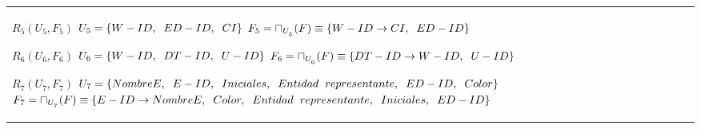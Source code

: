 \documentclass{report}
\begin{document}
\begin{tabularx}{\textwidth}{|X|}
        $ R_{5} ( U_{5} , F_{5} ) $ \newline 
        $ U_{5} = \{{W-ID, \hspace{0.2cm}  ED-ID, \hspace{0.2cm}  CI}\} $ \newline 
        $ F_{5} = \sqcap_{U_{_{5}}}(F) \equiv \{W-ID \rightarrow CI, \hspace{0.2cm} ED-ID \} $\newline 
        
        $ R_{6} ( U_{6} , F_{6} ) $ \newline 
        $ U_{6} = \{{W-ID, \hspace{0.2cm}  DT-ID, \hspace{0.2cm} U-ID}\} $ \newline 
        $ F_{6} = \sqcap_{U_{_{6}}}(F) \equiv \{DT-ID \rightarrow W-ID, \hspace{0.2cm} U-ID \} $\newline 
        
        $ R_{7} ( U_{7} , F_{7} ) $ \newline 
        $ U_{7} = \{{NombreE, \hspace{0.2cm}  E-ID, \hspace{0.2cm}  Iniciales, \hspace{0.2cm}  Entidad \hspace{0.2cm} representante, \hspace{0.2cm}  ED-ID, \hspace{0.2cm}  Color}\} $ \newline 
        $ F_{7} = \sqcap_{U_{_{7}}}(F) \equiv \{E-ID \rightarrow NombreE, \hspace{0.2cm} Color, \hspace{0.2cm} Entidad \hspace{0.2cm} representante, \hspace{0.2cm} Iniciales, \hspace{0.2cm} ED-ID \} $\newline 
        

\end{tabularx}
\end{document}
